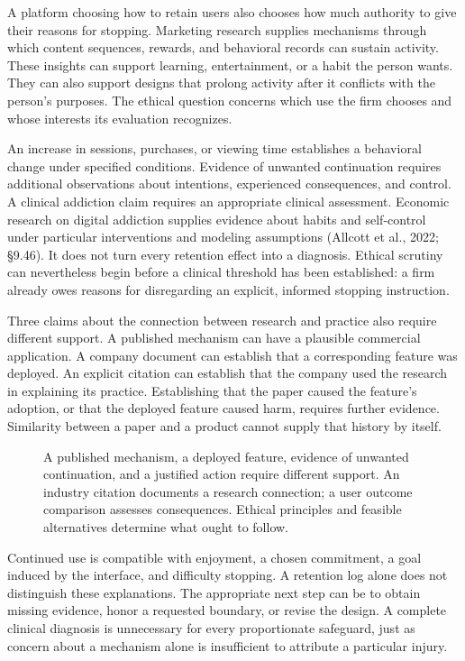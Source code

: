 \noindent \noindent A platform choosing how to retain users also chooses how much
authority to give their reasons for stopping. Marketing research
supplies mechanisms through which content sequences, rewards, and
behavioral records can sustain activity. These insights can support
learning, entertainment, or a habit the person wants. They can also
support designs that prolong activity after it conflicts with the
person's purposes. The ethical question concerns which use the firm
chooses and whose interests its evaluation recognizes.

An increase in sessions, purchases, or viewing time establishes a
behavioral change under specified conditions. Evidence of unwanted
continuation requires additional observations about intentions,
experienced consequences, and control. A clinical addiction claim
requires an appropriate clinical assessment. Economic research on
digital addiction supplies evidence about habits and self-control under
particular interventions and modeling assumptions (Allcott et al., 2022;
§9.46). It does not turn every retention effect into a diagnosis.
Ethical scrutiny can nevertheless begin before a clinical threshold has
been established: a firm already owes reasons for disregarding an
explicit, informed stopping instruction.

Three claims about the connection between research and practice also
require different support. A published mechanism can have a plausible
commercial application. A company document can establish that a
corresponding feature was deployed. An explicit citation can establish
that the company used the research in explaining its practice.
Establishing that the paper caused the feature's adoption, or that the
deployed feature caused harm, requires further evidence. Similarity
between a paper and a product cannot supply that history by itself.

\begin{figure}[htbp]
\centering

\caption{A published mechanism, a deployed feature, evidence of unwanted continuation, and a justified action require different support. An industry citation documents a research connection; a user outcome comparison assesses consequences. Ethical principles and feasible alternatives determine what ought to follow.}\label{fig:M09_engagement_evidence}
\end{figure}

Continued use is compatible with enjoyment, a chosen commitment, a goal
induced by the interface, and difficulty stopping. A retention log alone
does not distinguish these explanations. The appropriate next step can
be to obtain missing evidence, honor a requested boundary, or revise the
design. A complete clinical diagnosis is unnecessary for every
proportionate safeguard, just as concern about a mechanism alone is
insufficient to attribute a particular injury.

